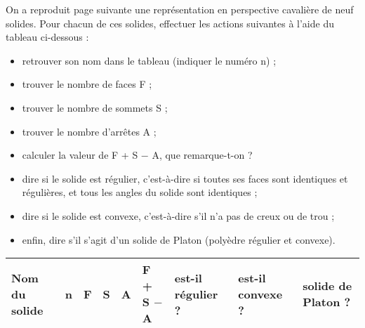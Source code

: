 \vspace*{-15mm}
\begin{enigme}
    \begin{changemargin}{-10mm}{-10mm}
        On a reproduit page suivante une représentation en perspective cavalière de neuf solides. Pour chacun de ces solides, effectuer les actions suivantes à l'aide du tableau ci-dessous :
        \begin{itemize}
           \item retrouver son nom dans le tableau (indiquer le numéro n) ;
           \item trouver le nombre de faces F ;
           \item trouver le nombre de sommets S ;
           \item trouver le nombre d'arrêtes A ;
           \item calculer la valeur de F + S $-$ A, que remarque-t-on ?
           \item dire si le solide est régulier, c'est-à-dire si toutes ses faces sont identiques et régulières, et tous les angles du solide sont identiques ;
           \item dire si le solide est convexe, c'est-à-dire s'il n'a pas de \og creux \fg{} ou de trou ;
           \item enfin, dire s'il s'agit d'un solide de Platon (polyèdre régulier et convexe).
        \end{itemize}
        \begin{center}   
           {\renewcommand{\arraystretch}{2.2}
           \begin{tabular}{|>{\centering\arraybackslash}m{2.5cm}|>{\centering\arraybackslash}p{0.9cm}|>{\centering\arraybackslash}p{0.9cm}|>{\centering\arraybackslash}p{0.9cm}|>{\centering\arraybackslash}p{0.9cm}|>{\centering\arraybackslash}p{1.9cm}|>{\centering\arraybackslash}m{1.4cm}|>{\centering\arraybackslash}m{1.4cm}|>{\centering\arraybackslash}m{1.4cm}|}
              \hline
              \rowcolor{LightGray}Nom du solide & n & F & S & A & F + S $-$ A & est-il régulier ? & est-il convexe ? & solide de Platon ? \\
              \hline

\end{tabular}}
\end{center}
\end{changemargin}
\end{enigme}
